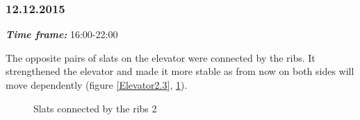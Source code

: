 \subsubsection{12.12.2015}
\textit{\textbf{Time frame:}} 16:00-22:00 

The opposite pairs of slats on the elevator were connected by the ribs. It strengthened the elevator and made it more stable as from now on both sides will move dependently (figure \ref{Elevator2.3}, \ref{Elevator2.4}).

\begin{figure}[H]
	\begin{minipage}[h]{0.47\linewidth}
		\caption{Slats connected by the ribs 1}
		\label{Elevator2.3}
	\end{minipage}
	\hfill
	\begin{minipage}[h]{0.47\linewidth}
		\caption{Slats connected by the ribs 2}
		\label{Elevator2.4}
	\end{minipage}
\end{figure}

